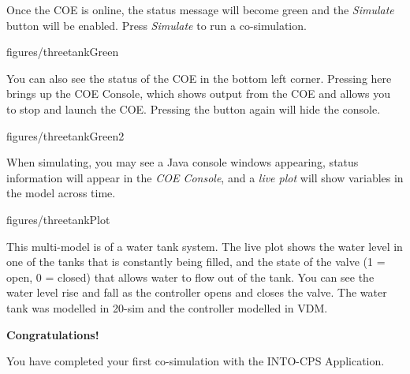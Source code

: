\documentclass[11pt,a4paper]{../tutorial}
\begin{document}
\begin{instructions}
\item Once the COE is online, the status message will become green and the \emph{Simulate} button will be enabled. Press \emph{Simulate} to run a co-simulation.

    \begin{annotation}[width=0.85\linewidth,trim=0 0 0 0,clip]{figures/threetankGreen}
    \end{annotation}

    You can also see the status of the COE in the bottom left corner. Pressing here brings up the COE Console, which shows output from the COE and allows you to stop and launch the COE. Pressing the button again will hide the console.

    \begin{annotation}[width=0.85\linewidth,trim=0 0 0 240,clip]{figures/threetankGreen2}
    \end{annotation}

\newpage
\item When simulating, you may see a Java console windows appearing, status information will appear in the \emph{COE Console}, and a \emph{live plot} will show variables in the model across time.

    \begin{annotation}[width=0.84\linewidth]{figures/threetankPlot}
    \end{annotation}

    This multi-model is of a water tank system. The live plot shows the water level in one of the tanks that is constantly being filled, and the state of the valve (1 = open, 0 = closed) that allows water to flow out of the tank. You can see the water level rise and fall as the controller opens and closes the valve. The water tank was modelled in 20-sim and the controller modelled in VDM.

    \bigskip
    \bigskip
    {\large\bfseries Congratulations!}

    You have completed your first co-simulation with the INTO-CPS Application.

\end{instructions}
\end{document}
